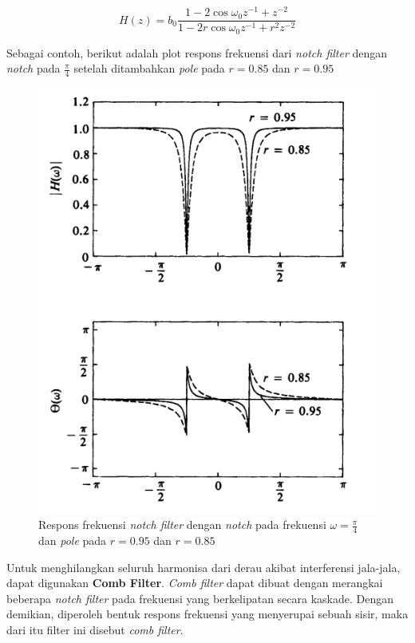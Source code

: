 \documentclass[11pt]{article}
\begin{document}
\begin{equation}
    H(z) = b_0 \frac{1 - 2 \cos{\omega_0} z^{-1} + z^{-2}}{1 - 2r \cos{\omega_0} z^{-1} + r^2 z^{-2}}
\end{equation}

Sebagai contoh, berikut adalah plot respons frekuensi dari \textit{notch filter} dengan \textit{notch} pada $\frac{\pi}{4}$ setelah ditambahkan \textit{pole} pada $r = 0.85$ dan $r = 0.95$

\begin{figure}[H]
\centerline{\includegraphics[scale=0.4]{figures/fig8-notchfreqrespwithpoles.png}}
\caption{Respons frekuensi \textit{notch filter} dengan \textit{notch} pada frekuensi $\omega = \frac{\pi}{4}$ dan \textit{pole} pada $r = 0.95$ dan $r = 0.85$}
\end{figure}

Untuk menghilangkan seluruh harmonisa dari derau akibat interferensi jala-jala, dapat digunakan \textbf{Comb Filter}. \textit{Comb filter} dapat dibuat dengan merangkai beberapa \textit{notch filter} pada frekuensi yang berkelipatan secara kaskade. Dengan demikian, diperoleh bentuk respons frekuensi yang menyerupai sebuah sisir, maka dari itu filter ini disebut \textit{comb filter}.
\end{document}
